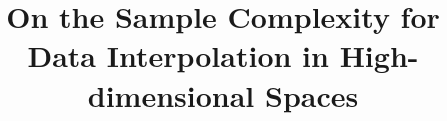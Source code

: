 \documentclass[conference,a4paper]{IEEEtran}
\begin{document}
\title{On the Sample Complexity for Data Interpolation in High-dimensional Spaces}

\author{%
}

%
%
%
%
\end{document}
